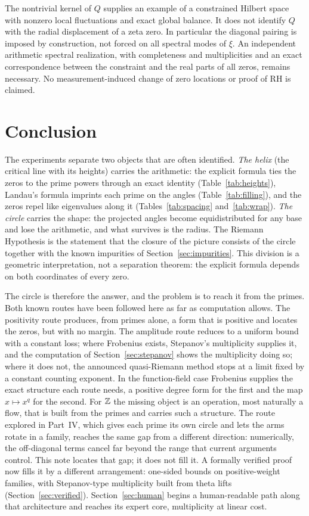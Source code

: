 \documentclass[11pt,a4paper]{article}
\theoremstyle{definition}\newtheorem{definition}[proposition]{Definition}
\theoremstyle{remark}\newtheorem{remark}[proposition]{Remark}
\begin{document}
The nontrivial kernel of $Q$ supplies an example of a constrained Hilbert space with nonzero local fluctuations and exact global balance. It does not identify $Q$ with the radial displacement of a zeta zero. In particular the diagonal pairing is imposed by construction, not forced on all spectral modes of $\xi$. An independent arithmetic spectral realization, with completeness and multiplicities and an exact correspondence between the constraint and the real parts of all zeros, remains necessary. No measurement-induced change of zero locations or proof of RH is claimed.

\section{Conclusion}\label{sec:conclusion}
The experiments separate two objects that are often identified. \emph{The helix} (the critical line with its heights) carries the arithmetic: the explicit formula ties the zeros to the prime powers through an exact identity (Table~\ref{tab:heights}), Landau's formula imprints each prime on the angles (Table~\ref{tab:filling}), and the zeros repel like eigenvalues along it (Tables~\ref{tab:spacing} and~\ref{tab:wrap}). \emph{The circle} carries the shape: the projected angles become equidistributed for any base and lose the arithmetic, and what survives is the radius. The Riemann Hypothesis is the statement that the closure of the picture consists of the circle together with the known impurities of Section~\ref{sec:impurities}. This division is a geometric interpretation, not a separation theorem: the explicit formula depends on both coordinates of every zero.

The circle is therefore the answer, and the problem is to reach it from the primes. Both known routes have been followed here as far as computation allows. The positivity route produces, from primes alone, a form that is positive and locates the zeros, but with no margin. The amplitude route reduces to a uniform bound with a constant loss; where Frobenius exists, Stepanov's multiplicity supplies it, and the computation of Section~\ref{sec:stepanov} shows the multiplicity doing so; where it does not, the announced quasi-Riemann method stops at a limit fixed by a constant counting exponent. In the function-field case Frobenius supplies the exact structure each route needs, a positive degree form for the first and the map $x\mapsto x^q$ for the second. For $\mathbb Z$ the missing object is an operation, most naturally a flow, that is built from the primes and carries such a structure. The route explored in Part~IV, which gives each prime its own circle and lets the arms rotate in a family, reaches the same gap from a different direction: numerically, the off-diagonal terms cancel far beyond the range that current arguments control. This note locates that gap; it does not fill it. A formally verified proof now fills it by a different arrangement: one-sided bounds on positive-weight families, with Stepanov-type multiplicity built from theta lifts (Section~\ref{sec:verified}). Section~\ref{sec:human} begins a human-readable path along that architecture and reaches its expert core, multiplicity at linear cost.
\end{document}
